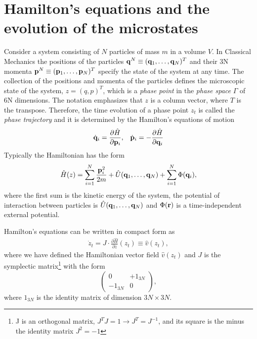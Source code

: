 \documentclass[b5paper,openright,10pt]{book}
\begin{document}
\section{Hamilton's equations and the evolution of the microstates}
\label{Sec:Hamilton}
Consider a system consisting of $N$ particles of mass $m$ in a volume $V$. 
In Classical Mechanics the positions of the particles ${\bf q}^N\equiv ({\bf q}_1,\dots,{\bf q}_N)^T$ and their 3N momenta ${\bf p}^N\equiv ({\bf p}_1,\dots,{\bf p}_N)^T$ specify the state of the system at any time. 
The collection of the positions and momenta of the particles defines the microscopic state of the system, $z=(q,p)^T$, which is a {\it phase point} in the {\it phase space} $\Gamma$ of 6N dimensions. 
The notation emphasizes that $z$ is a column vector, where $T$ is the transpose. 
Therefore, the time evolution of a phase point $z_t$ is called the {\it phase trajectory} and it is determined by the Hamilton's equations of motion
%
\begin{align}
  \dot{{\bf q}}_i = \frac{\partial \hat{H}}{\partial {\bf p}_i}&,& \dot{{\bf p}}_i = -\frac{\partial \hat{H}}{\partial {\bf q}_i}
  \label{Hamiltonequation}
\end{align}
%
Typically the Hamiltonian has the form
%
\begin{align}
    \hat{H}(z) = \sum_{i=1}^{N}\frac{{\bf p}_i^2}{2m}+\hat{U}({\bf q}_1,\dots,{\bf q}_N)+\sum_{i=1}^{N}\Phi({\bf q}_i),
\end{align}
%
where the first sum is the kinetic energy of the system, the potential of interaction
between particles is $\hat{U}({\bf q}_1,\dots,{\bf q}_N)$ and $\Phi({\bf r})$ is a time-independent external potential. 


Hamilton's equations can be written in compact form as
%
\begin{align}
  \dot{z}_t = J\cdot\frac{\partial\hat{H}}{\partial{z}}(z_t)\equiv \hat{v}(z_t),
  \label{compactHamiltonEq}
\end{align}
%
where we have defined the Hamiltonian vector field $\hat{v}(z_t)$ and $J$ is the symplectic matrix\footnote{J is an orthogonal matrix, $J^TJ=1\to J^T = J^{-1}$, and its square is the minus the identity matrix $J^2=-1$} with the form
$$
\begin{pmatrix} 
  0 & +1_{3N} \\
  -1_{3N} & 0 
\end{pmatrix},
$$
where $1_{3N}$ is the identity matrix of dimension $3N \times 3N$.
\end{document}
